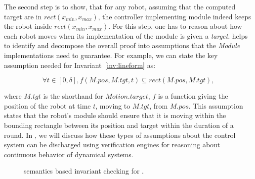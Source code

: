 The second step is to show, that for any robot, assuming that the computed target are in $\mathit{rect}(x_{min}, x_{max})$,
the controller implementing \Motion module indeed keeps the robot inside $\mathit{rect}(x_{min}, x_{max})$.
%
For this step, one has to reason about how each robot moves when its implementation of the \Motion module is given a \emph{target}.
\lgname helps to identify and decompose the overall proof into assumptions that the \emph{Module} implementations need to guarantee.
For example, we can state the key assumption needed for Invariant~\ref{inv:lineform} as:
\begin{assumption}
\label{lineform-assume}
\[
\forall t \in [0, \delta], f(M.pos, M.tgt, t) \subseteq rect(M.pos, M.tgt),
\]
\end{assumption}
\noindent
where $M.tgt$ is the shorthand for $Motion.target$,
$f$ is a function giving the position of the robot at time $t$, moving to $M.tgt$, from $M.pos$.
This assumption states that the robot's \Motion module should ensure that it is moving within the bounding rectangle between its position and target within the duration of a round.
In , we will discuss how these types of assumptions about the control system can be discharged using verification engines for reasoning about continuous behavior of dynamical systems.

\begin{figure}
\caption{\K semantics based invariant checking for \lgname.}
\label{fig:tools}
\end{figure}



